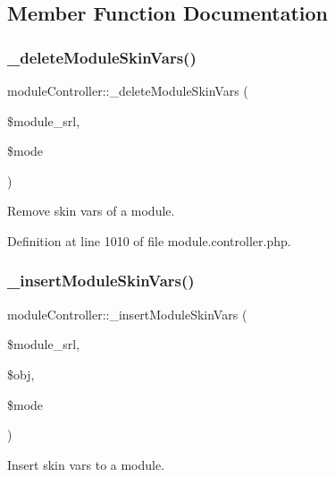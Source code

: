 \subsection{Member Function Documentation}
\mbox{\label{classmoduleController_a88baeaa3755f270af223e17e7a96d20a}} 
\subsubsection{\texorpdfstring{\+\_\+delete\+Module\+Skin\+Vars()}{\_deleteModuleSkinVars()}}
{\footnotesize\ttfamily module\+Controller\+::\+\_\+delete\+Module\+Skin\+Vars (\begin{DoxyParamCaption}\item[{}]{\$module\+\_\+srl,  }\item[{}]{\$mode }\end{DoxyParamCaption})}



Remove skin vars of a module. 



Definition at line 1010 of file module.\+controller.\+php.

\mbox{\label{classmoduleController_aea2dfb4f6a1d31acdbebf131058494cd}} 
\subsubsection{\texorpdfstring{\+\_\+insert\+Module\+Skin\+Vars()}{\_insertModuleSkinVars()}}
{\footnotesize\ttfamily module\+Controller\+::\+\_\+insert\+Module\+Skin\+Vars (\begin{DoxyParamCaption}\item[{}]{\$module\+\_\+srl,  }\item[{}]{\$obj,  }\item[{}]{\$mode }\end{DoxyParamCaption})}



Insert skin vars to a module. 



